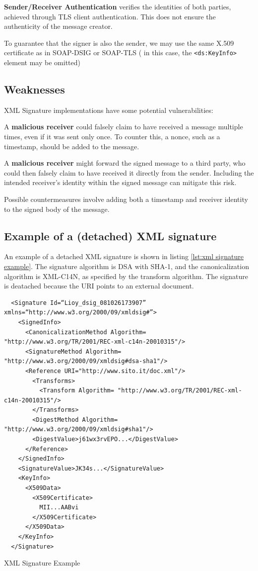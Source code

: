 \textbf{Sender/Receiver Authentication} verifies the identities of
both parties, achieved through TLS client authentication. This does
not ensure the authenticity of the message creator.

To guarantee that the signer is also the sender, we may use
the same X.509 certificate as in SOAP-DSIG or SOAP-TLS
( in this case, the \texttt{<ds:KeyInfo>} element may be
omitted)

\subsection{Weaknesses}

XML Signature implementations have some potential vulnerabilities:

A \textbf{malicious receiver} could falsely claim to have received a
message multiple times, even if it was sent only once. To counter
this, a nonce, such as a timestamp, should be added to the message.

A \textbf{malicious receiver} might forward the signed message to a
third party, who could then falsely claim to have received it directly
from the sender. Including the intended receiver's identity within the
signed message can mitigate this risk.

Possible countermeasures involve adding both a timestamp and receiver
identity to the signed body of the message.

\subsection{Example of a (detached) XML signature}

An example of a detached XML signature is shown in listing
\ref{lst:xml signature example}. The signature algorithm is DSA with 
SHA-1, and the canonicalization algorithm is XML-C14N, as specified by
the transform algorithm. The signature is deatached because the URI 
points to an external document.

\begin{listing}[H]
  \centering
  \begin{verbatim}
  <Signature Id=“Lioy_dsig_081026173907” xmlns=“http://www.w3.org/2000/09/xmldsig#”>
    <SignedInfo>
      <CanonicalizationMethod Algorithm= "http://www.w3.org/TR/2001/REC-xml-c14n-20010315"/>
      <SignatureMethod Algorithm= "http://www.w3.org/2000/09/xmldsig#dsa-sha1"/>
      <Reference URI="http://www.sito.it/doc.xml"/>
        <Transforms>
          <Transform Algorithm= "http://www.w3.org/TR/2001/REC-xml-c14n-20010315"/>
        </Transforms>
        <DigestMethod Algorithm= "http://www.w3.org/2000/09/xmldsig#sha1"/>
        <DigestValue>j61wx3rvEPO...</DigestValue>
      </Reference>
    </SignedInfo>
    <SignatureValue>JK34s...</SignatureValue>
    <KeyInfo>
      <X509Data>
        <X509Certificate>
          MII...AABvi
        </X509Certificate>
      </X509Data>
    </KeyInfo>
  </Signature>
  \end{verbatim}
  \caption{XML Signature Example}
  \label{lst:xml signature example}
\end{listing}

